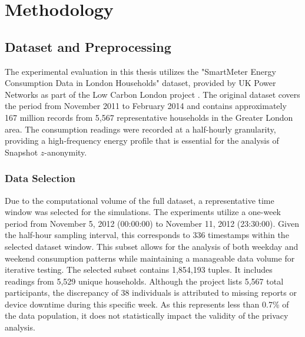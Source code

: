 \chapter{Methodology}

\section{Dataset and Preprocessing}
\label{sec:dataset}
The experimental evaluation in this thesis utilizes the "SmartMeter Energy Consumption Data in London Households" dataset, provided by UK Power Networks as part of the Low Carbon London project \cite{londonSmartMeter2014}. The original dataset covers the period from November 2011 to February 2014 and contains approximately 167 million records from 5,567 representative households in the Greater London area. The consumption readings were recorded at a half-hourly granularity, providing a high-frequency energy profile that is essential for the analysis of Snapshot $z$-anonymity.

\subsection{Data Selection}
Due to the computational volume of the full dataset, a representative time window was selected for the simulations. The experiments utilize a one-week period from November 5, 2012 (00:00:00) to November 11, 2012 (23:30:00). Given the half-hour sampling interval, this corresponds to 336 timestamps within the selected dataset window. This subset allows for the analysis of both weekday and weekend consumption patterns while maintaining a manageable data volume for iterative testing.
The selected subset contains 1,854,193 tuples. It includes readings from 5,529 unique households. Although the project lists 5,567 total participants, the discrepancy of 38 individuals is attributed to missing reports or device downtime during this specific week. As this represents less than 0.7\% of the data population, it does not statistically impact the validity of the privacy analysis.

